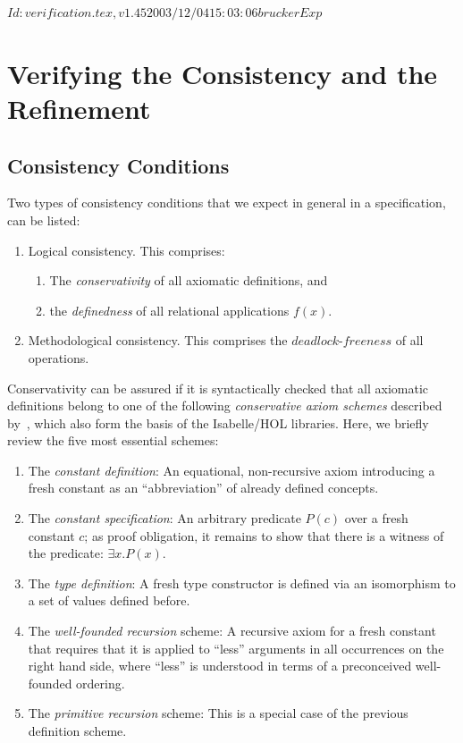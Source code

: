 \rcsInfo $Id: verification.tex,v 1.45 2003/12/04 15:03:06 brucker Exp $

\chapter{Verifying the Consistency and the Refinement}\label{chap:verification}

\section{Consistency Conditions}\label{sec:consistency}

Two types of consistency conditions that we expect in general in a
specification, can be listed:
\begin{enumerate}
\item Logical consistency. This comprises:
  \begin{enumerate}
  \item The \emph{conservativity} of all axiomatic definitions, and
  \item the \emph{definedness} of all relational applications $f(x)$.
  \end{enumerate}
\item Methodological consistency. This comprises the $deadlock$-$freeness$ of
  all operations.
\end{enumerate}

Conservativity can be assured if it is syntactically checked that all axiomatic
definitions belong to one of the following \emph{conservative axiom schemes}
described by~\cite{gordon.ea:hol:1993}, which also form the basis of the
Isabelle/HOL libraries.  Here, we briefly review the five most essential
schemes:
\begin{enumerate}
\item The \emph{constant definition}: An equational, non-recursive axiom
  introducing a fresh constant as an ``abbreviation'' of already defined
  concepts.
\item The \emph{constant specification}: An arbitrary predicate $P(c)$ over a fresh
  constant $c$; as proof obligation, it remains to show that there is a witness of
  the predicate: $\exists x. P(x)$.
\item The \emph{type definition}: A fresh type constructor is defined via an
  isomorphism to a set of values defined before.
\item The \emph{well-founded recursion} scheme: A recursive axiom for a fresh
  constant that requires that it is applied to ``less'' arguments in all
  occurrences on the right hand side, where ``less'' is understood in terms of a
  preconceived well-founded ordering.
\item The \emph{primitive recursion} scheme: This is a special case of the
  previous definition scheme.
\end{enumerate}

